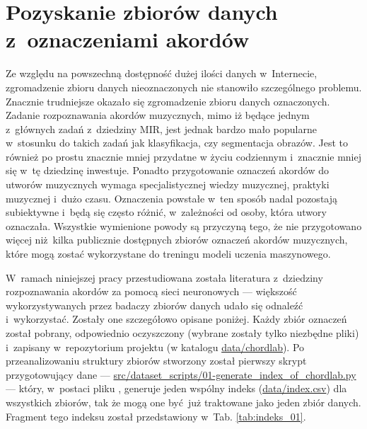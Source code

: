 \section{Pozyskanie zbiorów danych z~oznaczeniami akordów}

Ze względu na powszechną dostępność dużej ilości danych w~Internecie, zgromadzenie zbioru danych nieoznaczonych nie stanowiło szczególnego problemu. Znacznie trudniejsze okazało się zgromadzenie zbioru danych oznaczonych. Zadanie rozpoznawania akordów muzycznych, mimo iż będące jednym z~głównych zadań z~dziedziny MIR, jest jednak bardzo mało popularne w~stosunku do takich zadań jak klasyfikacja, czy segmentacja obrazów. Jest to również po prostu znacznie mniej przydatne w życiu codziennym i~znacznie mniej się w~tę dziedzinę inwestuje. Ponadto przygotowanie oznaczeń akordów do utworów muzycznych wymaga specjalistycznej wiedzy muzycznej, praktyki muzycznej i~dużo czasu. Oznaczenia powstałe w~ten sposób nadal pozostają subiektywne i~będą się często różnić, w~zależności od osoby, która utwory oznaczała. Wszystkie wymienione powody są przyczyną tego, że nie przygotowano więcej niż kilka publicznie dostępnych zbiorów oznaczeń akordów muzycznych, które mogą zostać wykorzystane do treningu modeli uczenia maszynowego.

W~ramach niniejszej pracy przestudiowana została literatura z~dziedziny rozpoznawania akordów za pomocą sieci neuronowych --- większość wykorzystywanych przez badaczy zbiorów danych udało się odnaleźć i~wykorzystać. Zostały one szczegółowo opisane poniżej. Każdy zbiór oznaczeń został pobrany, odpowiednio oczyszczony (wybrane zostały tylko niezbędne pliki) i~zapisany w~repozytorium projektu (w katalogu \url{data/chordlab}). Po przeanalizowaniu struktury zbiorów stworzony został pierwszy skrypt przygotowujący dane --- \url{src/dataset_scripts/01-generate_index_of_chordlab.py} --- który, w~postaci pliku , generuje jeden wspólny indeks (\url{data/index.csv}) dla wszystkich zbiorów, tak że mogą one być już traktowane jako jeden zbiór danych. Fragment tego indeksu został przedstawiony w~Tab. \ref{tab:indeks_01}.

